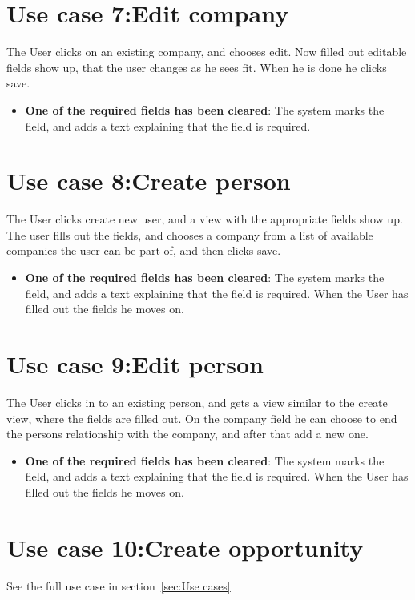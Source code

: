 \section{Use case 7:Edit company }
The User clicks on an existing company, and chooses edit. Now filled out editable fields show up, that the user changes as he sees fit. When he is done he clicks save.
\begin{itemize}
  \item \textbf{One of the required fields has been cleared}: The system marks the field, and adds a text explaining that the field is required.
\end{itemize}

\section{Use case 8:Create person }
The User clicks create new user, and a view with the appropriate fields show up. The user fills out the fields, and chooses a company from a list of available companies the user can be part of, and then clicks save.

\begin{itemize}
  \item \textbf{One of the required fields has been cleared}: The system marks the field, and adds a text explaining that the field is required. When the User has filled out the fields he moves on.
\end{itemize}

\section{Use case 9:Edit person }
The User clicks in to an existing person, and gets a view similar to the create view, where the fields are filled out. On the company field he can choose to end the persons relationship with the company, and after that add a new one.

\begin{itemize}
  \item \textbf{One of the required fields has been cleared}: The system marks the field, and adds a text explaining that the field is required. When the User has filled out the fields he moves on.
\end{itemize}

\section{Use case 10:Create opportunity }
See the full use case in section~\ref{sec:Use cases}

